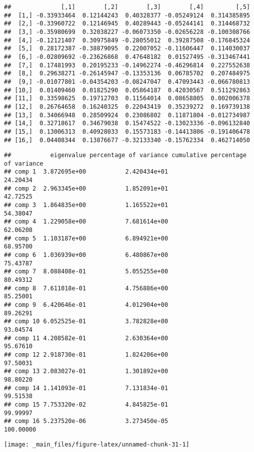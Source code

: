 \documentclass[
]{article}
\begin{document}
\begin{verbatim}
##              [,1]        [,2]        [,3]        [,4]         [,5]
##  [1,] -0.33933464  0.12144243  0.40328377 -0.05249124  0.314385895
##  [2,] -0.33960722  0.12146945  0.40289443 -0.05244141  0.314468732
##  [3,] -0.35980699  0.32038227 -0.06073350 -0.02656228 -0.100308766
##  [4,] -0.12121407  0.30975849 -0.28055012  0.39287508 -0.176845324
##  [5,]  0.28172387 -0.38879095  0.22007052 -0.11606447  0.114030037
##  [6,] -0.02809692 -0.23626868  0.47648182  0.01527495 -0.313467441
##  [7,]  0.17481993  0.20195233 -0.14962274 -0.46296814  0.227552638
##  [8,]  0.29638271 -0.26145947 -0.13353136  0.06785702  0.207484975
##  [9,] -0.01077801 -0.04354203 -0.08247047  0.47093443 -0.066780813
## [10,]  0.01409460  0.01825290  0.05864187  0.42030567  0.511292863
## [11,]  0.33598625  0.19712703  0.11564014  0.08658805  0.002006378
## [12,]  0.26764658  0.16240325  0.22043419  0.35239272  0.169739138
## [13,]  0.34066948  0.28509924  0.23086802  0.11871804 -0.012734987
## [14,]  0.32718617  0.34679038  0.15474522 -0.13023336 -0.096132840
## [15,]  0.13006313  0.40928033  0.15573183 -0.14413806 -0.191406478
## [16,]  0.04408344  0.13876677 -0.32133340 -0.15762334  0.462714050
\end{verbatim}

\begin{verbatim}
##           eigenvalue percentage of variance cumulative percentage of variance
## comp 1  3.872695e+00           2.420434e+01                          24.20434
## comp 2  2.963345e+00           1.852091e+01                          42.72525
## comp 3  1.864835e+00           1.165522e+01                          54.38047
## comp 4  1.229058e+00           7.681614e+00                          62.06208
## comp 5  1.103187e+00           6.894921e+00                          68.95700
## comp 6  1.036939e+00           6.480867e+00                          75.43787
## comp 7  8.088408e-01           5.055255e+00                          80.49312
## comp 8  7.611018e-01           4.756886e+00                          85.25001
## comp 9  6.420646e-01           4.012904e+00                          89.26291
## comp 10 6.052525e-01           3.782828e+00                          93.04574
## comp 11 4.208582e-01           2.630364e+00                          95.67610
## comp 12 2.918730e-01           1.824206e+00                          97.50031
## comp 13 2.083027e-01           1.301892e+00                          98.80220
## comp 14 1.141093e-01           7.131834e-01                          99.51538
## comp 15 7.753320e-02           4.845825e-01                          99.99997
## comp 16 5.237520e-06           3.273450e-05                         100.00000
\end{verbatim}

\begin{center}\texttt{[image: \_main\_files/figure-latex/unnamed-chunk-31-1]} \end{center}

\newpage
\end{document}
